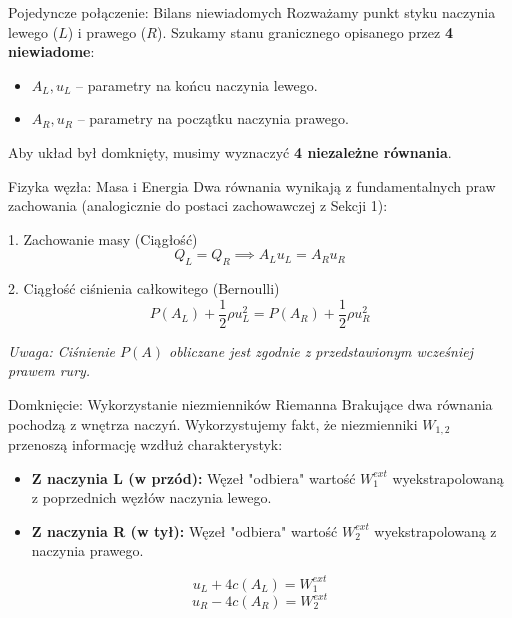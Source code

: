 \documentclass[aspectratio=169]{beamer}
\begin{document}
\begin{frame}{Pojedyncze połączenie: Bilans niewiadomych}
    Rozważamy punkt styku naczynia lewego ($L$) i prawego ($R$). 
    \vspace{0.4cm}
    Szukamy stanu granicznego opisanego przez \textbf{4 niewiadome}:
    \begin{itemize}
        \item $A_L, u_L$ -- parametry na końcu naczynia lewego.
        \item $A_R, u_R$ -- parametry na początku naczynia prawego.
    \end{itemize}
    \vspace{0.3cm}
    Aby układ był domknięty, musimy wyznaczyć \textbf{4 niezależne równania}.
\end{frame}

\begin{frame}{Fizyka węzła: Masa i Energia}
    Dwa równania wynikają z fundamentalnych praw zachowania (analogicznie do postaci zachowawczej z Sekcji 1):
    \vspace{0.3cm}
    \begin{block}{1. Zachowanie masy (Ciągłość)}
        \[ Q_L = Q_R \implies A_L u_L = A_R u_R \]
    \end{block}
    \begin{block}{2. Ciągłość ciśnienia całkowitego (Bernoulli)}
        \[ P(A_L) + \frac{1}{2}\rho u_L^2 = P(A_R) + \frac{1}{2}\rho u_R^2 \]
    \end{block}
    \centering \footnotesize \textit{Uwaga: Ciśnienie $P(A)$ obliczane jest zgodnie z przedstawionym wcześniej prawem rury.}
\end{frame}

\begin{frame}{Domknięcie: Wykorzystanie niezmienników Riemanna}
    Brakujące dwa równania pochodzą z wnętrza naczyń. Wykorzystujemy fakt, że niezmienniki $W_{1,2}$ przenoszą informację wzdłuż charakterystyk:
    \vspace{0.4cm}
    \begin{itemize}
        \item \textbf{Z naczynia L (w przód):} Węzeł "odbiera" wartość $W_1^{ext}$ wyekstrapolowaną z poprzednich węzłów naczynia lewego.
        \item \textbf{Z naczynia R (w tył):} Węzeł "odbiera" wartość $W_2^{ext}$ wyekstrapolowaną z naczynia prawego.
    \end{itemize}
    \[ u_L + 4c(A_L) = W_1^{ext} \]
    \[ u_R - 4c(A_R) = W_2^{ext} \]
\end{frame}
\end{document}
